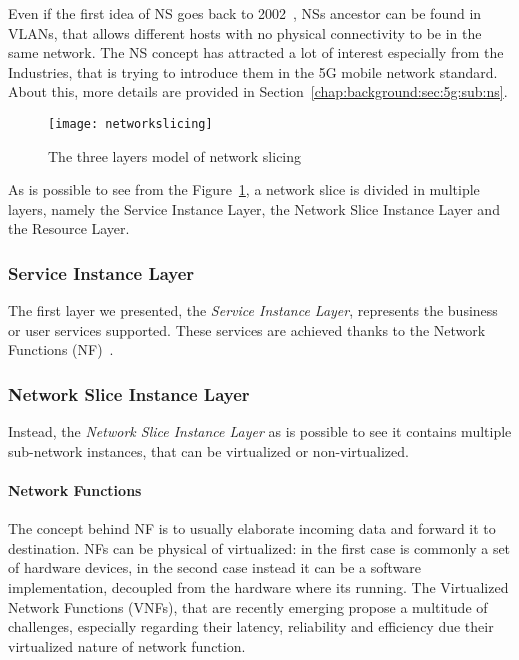 Even if the first idea of NS goes back to 2002~\cite{peterson2003blueprint}, NSs
ancestor can be found in VLANs, that allows different hosts with no physical
connectivity to be in the same network. The NS concept has attracted a lot of
interest especially from the Industries, that is trying to introduce them in the
5G mobile network standard. About this, more details are provided in
Section~\ref{chap:background:sec:5g:sub:ns}.

\begin{figure}[t]
  \centering
  \texttt{[image: networkslicing]}
  \caption[The three layers model of network slicing]{The three layers model of
    network slicing~\cite{alliance2016description}}
  \label{chap:background:img:network_slicing}
\end{figure}

As is possible to see from the Figure~\ref{chap:background:img:network_slicing},
a network slice is divided in multiple layers, namely the Service Instance
Layer, the Network Slice Instance Layer and the Resource Layer.

\subsubsection{Service Instance Layer}
The first layer we presented, the \emph{Service Instance Layer}, represents the
business or user services supported. These services are achieved thanks to the
Network Functions (NF)~\cite{kotulski2017end}.

\subsubsection{Network Slice Instance Layer}
Instead, the \emph{Network Slice Instance Layer} as is possible to see it
contains multiple sub-network instances, that can be virtualized or
non-virtualized.

\paragraph*{Network Functions}
The concept behind NF is to usually elaborate incoming data and forward it to
destination. NFs can be physical of virtualized: in the first case is commonly a
set of hardware devices, in the second case instead it can be a software
implementation, decoupled from the hardware where its running. The Virtualized
Network Functions (VNFs), that are recently emerging propose a multitude of
challenges, especially regarding their latency, reliability and efficiency due
their virtualized nature of network function.

